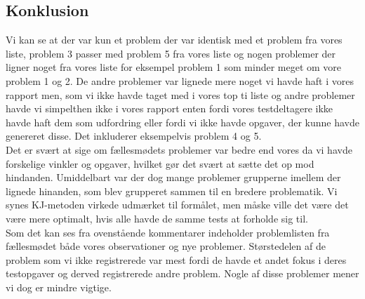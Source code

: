 \documentclass[12pt]{article}
\begin{document}
\subsection*{Konklusion}

Vi kan se at der var kun et problem der var identisk med et problem fra vores liste, problem 3 passer med problem 5 fra vores liste og nogen problemer der ligner noget fra vores liste for eksempel problem 1 som minder meget om vore problem 1 og 2. De andre problemer var lignede mere noget vi havde haft i vores rapport men, som vi ikke havde taget med i vores top ti liste og andre problemer havde vi simpelthen ikke i vores rapport enten fordi vores testdeltagere ikke havde haft dem som udfordring eller fordi vi ikke  havde opgaver, der kunne havde genereret disse. Det inkluderer eksempelvis problem 4 og 5. \\

\noindent Det er svært at sige om fællesmødets problemer var bedre end vores da vi havde forskelige vinkler og opgaver, hvilket gør det svært at sætte det op mod hindanden. Umiddelbart var der dog mange problemer grupperne imellem der lignede hinanden, som blev grupperet sammen til en bredere problematik. Vi synes KJ-metoden virkede udmærket til formålet, men måske ville det være det være mere optimalt, hvis alle havde de samme tests at forholde sig til.\\

\noindent Som det kan ses fra ovenstående kommentarer indeholder problemlisten fra fællesmødet både vores observationer og nye problemer. Størstedelen af de problem som vi ikke registrerede var mest fordi de havde et andet fokus i deres testopgaver og derved registrerede andre problem. Nogle af disse problemer mener vi dog er mindre vigtige.
\end{document}

